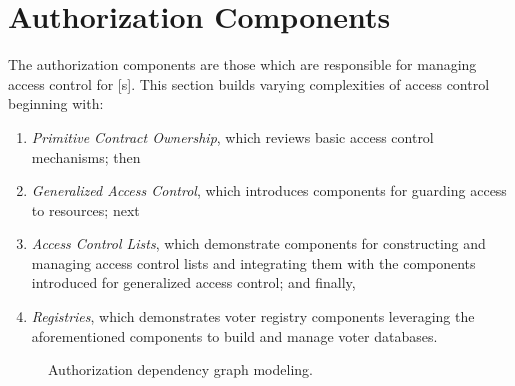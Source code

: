 \section{Authorization Components}

The authorization components are those which are responsible for managing access
control for [s]. This section builds varying complexities of
access control beginning with:

\begin{enumerate}
  \item \emph{Primitive Contract Ownership}, which reviews basic access control
    mechanisms; then

  \item \emph{Generalized Access Control}, which introduces components for
    guarding access to resources; next

  \item \emph{Access Control Lists}, which demonstrate components for
    constructing and managing access control lists and integrating them with the
    components introduced for generalized access control; and finally,

  \item \emph{Registries}, which demonstrates voter registry components
    leveraging the aforementioned components to build and manage voter
    databases.
\end{enumerate}

\begin{figure}[H]
  \centering
  \caption{Authorization dependency graph modeling.}%
\end{figure}








